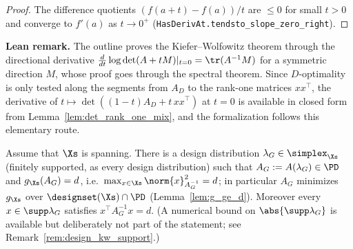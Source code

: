 \begin{proof}
\leanok
The difference quotients $(f(a+t) - f(a))/t$ are $\le 0$ for small $t > 0$ and converge to
$f'(a)$ as $t \to 0^+$ (\texttt{HasDerivAt.tendsto\_slope\_zero\_right}).
\end{proof}

\textbf{Lean remark.} The outline proves the Kiefer--Wolfowitz theorem through the directional
derivative $\frac{d}{dt}\log\det(A + tM)|_{t=0} = \tr(A^{-1}M)$ for a symmetric direction $M$,
whose proof goes through the spectral theorem. Since $D$-optimality is only tested along the
segments from $A_D$ to the rank-one matrices $xx^\top$, the derivative of
$t \mapsto \det((1-t)A_D + t\,xx^\top)$ at $t = 0$ is available in closed form from
Lemma~\ref{lem:det_rank_one_mix}, and the formalization follows this elementary route.

\begin{theorem}\label{thm:kiefer_wolfowitz}
\leanok
{}
Assume that $\Xs$ is spanning. There is a design distribution $\lambda_G \in \simplex_{\Xs}$
(finitely supported, as every design distribution) such that $A_G := A(\lambda_G)
\in \PD$ and $g_{\Xs}(A_G) = d$, i.e.\ $\max_{x\in\Xs}\norm{x}_{A_G^{-1}}^2 = d$; in particular
$A_G$ minimizes $g_{\Xs}$ over $\designset(\Xs)\cap\PD$ (Lemma~\ref{lem:g_ge_d}). Moreover every
$x \in \supp\lambda_G$ satisfies $x^\top A_G^{-1} x = d$. (A numerical bound on
$\abs{\supp\lambda_G}$ is available but deliberately not part of the statement; see
Remark~\ref{rem:design_kw_support}.)
\end{theorem}

